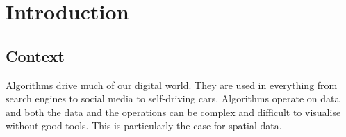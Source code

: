 \documentclass{l4proj}
\begin{document}
%
%
%

%
%
%
%
\chapter{Introduction}



\section{Context}

Algorithms drive much of our digital world. They are used in everything from search engines to social media to self-driving cars. Algorithms operate on data and both the data and the operations can be complex and difficult to visualise without good tools. This is particularly the case for spatial data.
\end{document}
